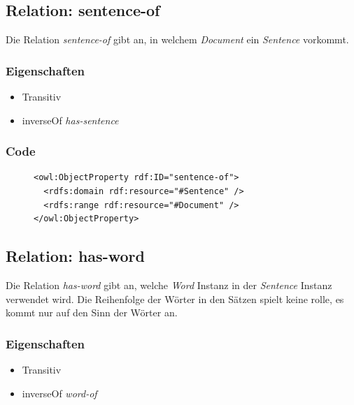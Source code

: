 \documentclass[
    11pt,
    latin1,
    a4paper,
    oneside
]{scrreprt}
\begin{document}
\subsection{Relation: sentence-of} \label{sec:rel_sentenceof}

Die Relation \emph{sentence-of} gibt an, in welchem \emph{Document} ein \emph{Sentence} vorkommt.

\subsubsection{Eigenschaften} \label{sec:rel_sentenceof_settings}

\begin{itemize}
  \item Transitiv
  \item inverseOf \emph{has-sentence}
\end{itemize}

\subsubsection{Code} \label{sec:rel_sentenceof_code}

\begin{figure}[H]
 \lstset{language=XML}
 \begin{lstlisting}[label=owl:sentenceof,caption={Die Relation \emph{sentenceof} gibt an, in welchem Dokument ein Satz vorkommt}]
<owl:ObjectProperty rdf:ID="sentence-of">
  <rdfs:domain rdf:resource="#Sentence" />
  <rdfs:range rdf:resource="#Document" />
</owl:ObjectProperty>
 \end{lstlisting}
\end{figure}


\subsection{Relation: has-word} \label{sec:rel_hasword}

Die Relation \emph{has-word} gibt an, welche \emph{Word} Instanz in der \emph{Sentence} Instanz verwendet wird. Die Reihenfolge der W\"orter in den S\"atzen spielt keine rolle, es kommt nur auf den Sinn der W\"orter an.

\subsubsection{Eigenschaften} \label{sec:rel_hasword_settings}

\begin{itemize}
  \item Transitiv
  \item inverseOf \emph{word-of}
\end{itemize}
\end{document}
